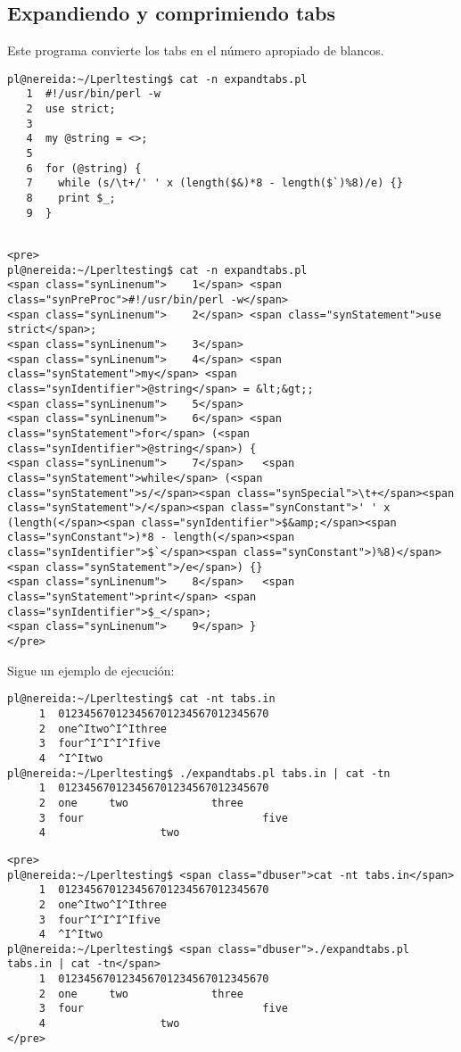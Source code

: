 \subsection{Expandiendo y comprimiendo tabs}
Este programa convierte los tabs en el número apropiado de blancos.
\begin{latexonly}
\begin{verbatim}
pl@nereida:~/Lperltesting$ cat -n expandtabs.pl
   1  #!/usr/bin/perl -w
   2  use strict;
   3  
   4  my @string = <>;
   5  
   6  for (@string) {
   7    while (s/\t+/' ' x (length($&)*8 - length($`)%8)/e) {}
   8    print $_;
   9  }
\end{verbatim}
\end{latexonly}
\begin{verbatim}

<pre>
pl@nereida:~/Lperltesting$ cat -n expandtabs.pl
<span class="synLinenum">    1</span> <span class="synPreProc">#!/usr/bin/perl -w</span>
<span class="synLinenum">    2</span> <span class="synStatement">use strict</span>;
<span class="synLinenum">    3</span> 
<span class="synLinenum">    4</span> <span class="synStatement">my</span> <span class="synIdentifier">@string</span> = &lt;&gt;;
<span class="synLinenum">    5</span> 
<span class="synLinenum">    6</span> <span class="synStatement">for</span> (<span class="synIdentifier">@string</span>) {
<span class="synLinenum">    7</span>   <span class="synStatement">while</span> (<span class="synStatement">s/</span><span class="synSpecial">\t+</span><span class="synStatement">/</span><span class="synConstant">' ' x (length(</span><span class="synIdentifier">$&amp;</span><span class="synConstant">)*8 - length(</span><span class="synIdentifier">$`</span><span class="synConstant">)%8)</span><span class="synStatement">/e</span>) {}
<span class="synLinenum">    8</span>   <span class="synStatement">print</span> <span class="synIdentifier">$_</span>;
<span class="synLinenum">    9</span> }
</pre>

\end{verbatim}
Sigue un ejemplo de ejecución:
\begin{latexonly}
\begin{verbatim}
pl@nereida:~/Lperltesting$ cat -nt tabs.in
     1  012345670123456701234567012345670
     2  one^Itwo^I^Ithree
     3  four^I^I^I^Ifive
     4  ^I^Itwo
pl@nereida:~/Lperltesting$ ./expandtabs.pl tabs.in | cat -tn
     1  012345670123456701234567012345670
     2  one     two             three
     3  four                            five
     4                  two
\end{verbatim}
\end{latexonly}
\begin{verbatim}
<pre>
pl@nereida:~/Lperltesting$ <span class="dbuser">cat -nt tabs.in</span>
     1  012345670123456701234567012345670
     2  one^Itwo^I^Ithree
     3  four^I^I^I^Ifive
     4  ^I^Itwo
pl@nereida:~/Lperltesting$ <span class="dbuser">./expandtabs.pl tabs.in | cat -tn</span>
     1  012345670123456701234567012345670
     2  one     two             three
     3  four                            five
     4                  two
</pre>
\end{verbatim}

